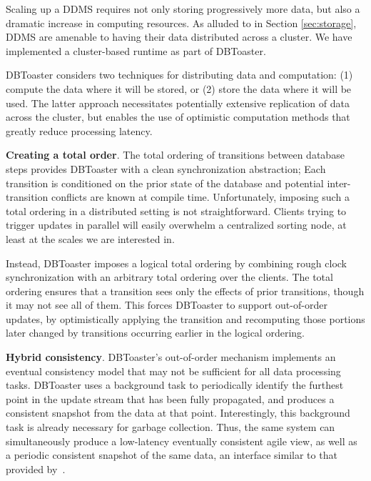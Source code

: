 Scaling up a DDMS requires not only storing progressively more data, but also a
dramatic increase in computing resources.  As alluded to in Section
\ref{sec:storage}, DDMS are amenable to having their data distributed across a
cluster.  We have implemented a cluster-based runtime as part of DBToaster.


DBToaster considers two techniques for distributing data and
computation: (1) compute the data where it will be stored, or (2) store the data
where it will be used.  The latter approach necessitates potentially extensive
replication of data across the cluster, but enables the use of optimistic
computation methods that greatly reduce processing latency.

\medspace 

{\bf Creating a total order}\/.
The total ordering of transitions between database steps provides DBToaster with
a clean synchronization abstraction; Each transition is conditioned on the prior
state of the database and potential inter-transition conflicts are known at
compile time.  Unfortunately, imposing such a total ordering in a distributed
setting is not straightforward.  Clients trying to trigger updates in parallel
will easily overwhelm a centralized sorting node, at least at the scales we are
interested in.

Instead, DBToaster imposes a logical total ordering by combining rough clock
synchronization with an arbitrary total ordering over the clients.  The total
ordering ensures that a transition sees only the effects of prior transitions,
though it may not see all of them.  This forces DBToaster to support
out-of-order updates, by optimistically applying the transition and recomputing
those portions later changed by transitions occurring earlier in the logical
ordering.

\medspace

{\bf Hybrid consistency}\/.
DBToaster's out-of-order mechanism implements an eventual consistency model that
may not be sufficient for all data processing tasks.  DBToaster uses a
background task to periodically identify the furthest point in the update stream
that has been fully propagated, and produces a consistent snapshot from the data
at that point.  Interestingly, this background task is already necessary for
garbage collection.  Thus, the same system can simultaneously produce a
low-latency eventually consistent agile view, as well as a periodic consistent
snapshot of the same data, an interface similar to that provided
by~\cite{bayou}.


